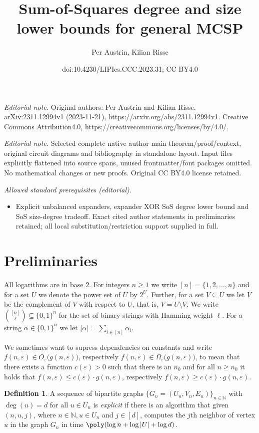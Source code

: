 \documentclass[10pt,a4paper]{article}
\title{Sum-of-Squares degree and size lower bounds for general MCSP}
\author{Per Austrin, Kilian Risse}
\date{doi:10.4230/LIPIcs.CCC.2023.31; CC BY4.0}
\theoremstyle{plain}
\theoremstyle{remark}
\theoremstyle{definition}
\newtheorem{definition}[theorem]{Definition}
\newcommand{\eps}{\varepsilon}
\newcommand{\set}[1]{\{#1\}}
\newcommand{\N}{\mathbb{N}}
\begin{document}
\maketitle
\setcounter{section}{1}
\noindent\textit{Editorial note.} Original authors: Per Austrin and Kilian Risse. arXiv:2311.12994v1 (2023-11-21), https://arxiv.org/abs/2311.12994v1. Creative Commons Attribution4.0, https://creativecommons.org/licenses/by/4.0/.\par\medskip
\noindent\textit{Editorial note.} Selected complete native author main theorem/proof/context, original circuit diagrams and bibliography in standalone layout. Input files explicitly flattened into source spans, unused frontmatter/font packages omitted. No mathematical changes or new proofs. Original CC BY4.0 license retained.\par\medskip
\noindent\textit{Allowed standard prerequisites (editorial).}\begin{itemize}
\item Explicit unbalanced expanders, expander XOR SoS degree lower bound and SoS size-degree tradeoff. Exact cited author statements in preliminaries retained; all local substitution/restriction support supplied in full.
\end{itemize}\medskip
\section{Preliminaries}
\label{sec:preliminaries}

All logarithms are in base $2$.  For integers $n \ge 1$ we write
$[n] = \set{1, 2, \ldots, n}$ and for a set $U$ we denote the power
set of $U$ by $2^{U}$. Further, for a set $V \subseteq U$ we let
$\overline V$ be the complement of $V$ with respect to $U$, that is,
$\overline V = U \setminus V$. We write
$\binom{[n]}{\ell} \subseteq \set{0,1}^n$ for the set of binary
strings with Hamming weight $\ell$. For a string
$\alpha \in \set{0,1}^n$ we let
$|\alpha| = \sum_{i \in [n]} \alpha_i$.

We sometimes want to supress dependencies on constants and write
$f(n, \eps) \in O_\eps\big(g(n, \eps)\big)$, respectively
$f(n, \eps) \in \Omega_\eps\big(g(n, \eps)\big)$, to mean that there
exists a function $c(\eps) > 0$ such that there is an $n_0$ and for all
$n \ge n_0$ it holds that $f(n, \eps) \le c(\eps) \cdot g(n, \eps)$,
respectively $f(n, \eps) \ge c(\eps)\cdot g(n, \eps)$.

\begin{definition}\label{def:explicit}
  A sequence of bipartite graphs $\set{G_n=(U_n, V_n, E_n)}_{n\in \N}$
  with $\deg(u) =d$ for all $u \in U_n$ is \emph{explicit} if there is
  an algorithm that given $(n, u, j)$, where $n \in \N, u \in U_n$ and
  $j\in [d]$, computes the $j$th neighbor of vertex $u$ in the graph
  $G_n$ in time $\poly(\log n + \log |U| + \log d)$.
\end{definition}
\end{document}
